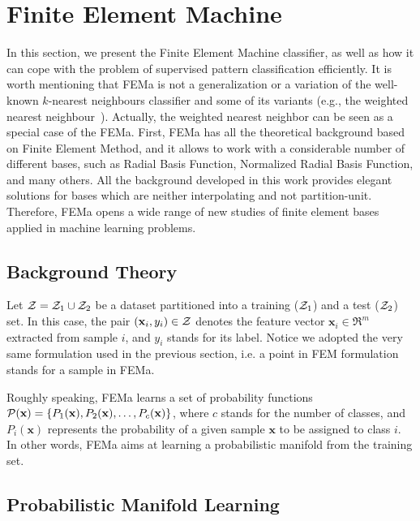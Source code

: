 \section{Finite Element Machine}
\label{s.fema}

In this section, we present the Finite Element Machine classifier, as well as how it can cope with the problem of supervised pattern classification efficiently. It is worth mentioning that FEMa is not a generalization or a variation of the well-known $k$-nearest neighbours classifier and some of its variants (e.g., the weighted nearest neighbour~\cite{Samworth:12}). Actually, the weighted nearest neighbor can be seen as a special case of the FEMa. First, FEMa has all the theoretical background based on Finite Element Method, and it allows to work with a considerable number of different bases, such as Radial Basis Function, Normalized Radial Basis Function, and many others. All the background developed in this work provides elegant solutions for bases which are neither interpolating and not partition-unit.  Therefore, FEMa opens a wide range of new studies of finite element bases applied in machine learning problems.

\subsection{Background Theory}
\label{ss.background}

Let ${\cal Z}={\cal Z}_1\cup{\cal Z}_2$ be a dataset partitioned into a training (${\cal Z}_1$) and a test (${\cal Z}_2$) set. In this case, the pair $(\textbf{x}_i,y_i)\in{\cal Z}$ denotes the feature vector $\textbf{x}_i\in\Re^m$ extracted from sample $i$, and $y_i$ stands for its label. Notice we adopted the very same formulation used in the previous section, i.e. a point in FEM formulation stands for a sample in FEMa.

Roughly speaking, FEMa learns a set of probability functions ${\cal P}(\textbf{x})=\{P_1(\textbf{x}),P_2(\textbf{x}),\ldots,P_c(\textbf{x})\}$, where $c$ stands for the number of classes, and $P_i(\textbf{x})$ represents the probability of a given sample $\textbf{x}$ to be assigned to class $i$. In other words, FEMa aims at learning a probabilistic manifold from the training set.

\subsection{Probabilistic Manifold Learning}
\label{ss.manifold}

